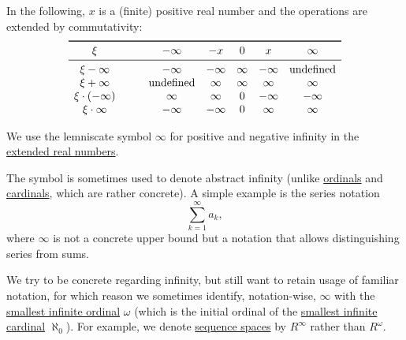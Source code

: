 \begin{definition}
  In the following, \( x \) is a (finite) positive real number and the operations are extended by commutativity:
  \begin{equation*}
    \begin{array}{c !{\qquad} *{5}{c}}
      \toprule
      \xi                 & -\infty       & -x      & 0      & x       & \infty        \\
      \midrule
      \xi - \infty        & -\infty       & -\infty & \infty & -\infty & \T{undefined} \\
      \xi + \infty        & \T{undefined} & \infty  & \infty & \infty  & \infty \\
      \xi \cdot (-\infty) & \infty        & \infty  & 0      & -\infty & -\infty \\
      \xi \cdot \infty    & -\infty       & -\infty & 0      & \infty  & \infty \\
    \end{array}
  \end{equation*}
\end{definition}

\begin{remark}\label{rem:lemniscate_symbol}
  We use the lemniscate symbol \( \infty \) for positive and negative infinity in the \hyperref[def:extended_real_numbers]{extended real numbers}.

  The symbol is sometimes used to denote abstract infinity (unlike \hyperref[def:ordinal]{ordinals} and \hyperref[def:cardinal]{cardinals}, which are rather concrete). A simple example is the series notation
  \begin{equation*}
    \sum_{k=1}^\infty a_k,
  \end{equation*}
  where \( \infty \) is not a concrete upper bound but a notation that allows distinguishing series from sums.

  We try to be concrete regarding infinity, but still want to retain usage of familiar notation, for which reason we sometimes identify, notation-wise, \( \infty \) with the \hyperref[thm:omega_is_an_ordinal]{smallest infinite ordinal} \( \omega \) (which is the initial ordinal of the \hyperref[def:aleph_hierarchy]{smallest infinite cardinal} \( \aleph_0 \)). For example, we denote \hyperref[def:sequence_space]{sequence spaces} by \( R^\infty \) rather than \( R^\omega \).
\end{remark}

